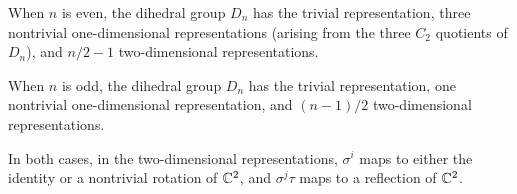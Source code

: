 \begin{prop}\label{prop:dnchartable}

  When $n$ is even, the dihedral group $D_n$ has the trivial representation,
three nontrivial one-dimensional representations (arising from the three $C_2$
quotients of $D_n$), and $n/2 - 1$ two-dimensional representations.

  When $n$ is odd, the dihedral group $D_n$ has the trivial representation, one
nontrivial one-dimensional representation, and $(n - 1)/2$ two-dimensional
representations.

  In both cases, in the two-dimensional representations, $\sigma^i$ maps to
either the identity or a nontrivial rotation of $\mathbb{C}^2$, and $\sigma^j\tau$ maps
to a reflection of $\mathbb{C}^2$.
\end{prop}
